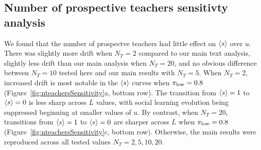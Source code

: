 \documentclass[letterpaper,11.5pt]{scrartcl}
\begin{document}
\clearpage

\subsection{Number of prospective teachers sensitivty analysis}

We found that the number of prospectve teachers had little effect on $\langle s \rangle$
over $u$. There was slightly more drift when $N_T = 2$ compared to our 
main text analysis, slightly less drift than our main analysis when $N_T = 20$, 
and no obvious difference between $N_T = 10$ tested here and our main results
with $N_T = 5$. When $N_T = 2$, increased drift is most notable in the
$\langle s \rangle$ curves when $\pi_{\mathrm{low}}=0.8$ (Figure~\ref{fig:nteachersSensitivity}a, 
bottom row). The transition from $\langle s \rangle = 1$ to $\langle s \rangle = 0$ is less sharp
across $L$ values, with social learning evolution being suppressed beginning
at smaller values of $u$. By contrast, when $N_T = 20$, transitions from 
$\langle s \rangle = 1$ to $\langle s \rangle = 0$ are sharper across $L$ when $\pi_{\mathrm{low}} = 0.8$
(Figure~\ref{fig:nteachersSensitivity}c, bottom row). Otherwise, the main 
results were reproduced across all tested values $N_T=2,5,10,20$.

\clearpage
\end{document}
